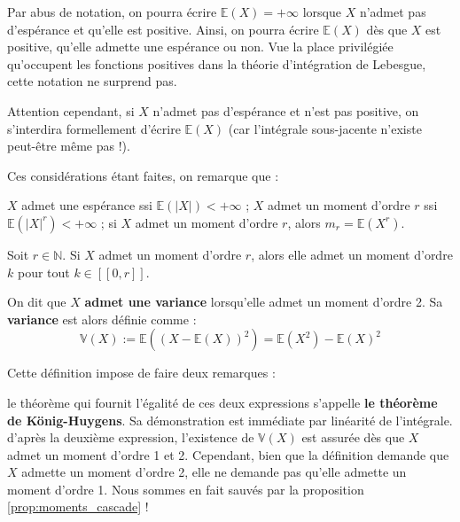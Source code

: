 \documentclass[../integ-proba.tex]{subfiles}
\begin{document}
\begin{rem}
    Par abus de notation, on pourra écrire $\mathbb{E}(X)=+\infty$ lorsque $X$ n'admet pas d'espérance et qu'elle est positive.
    Ainsi, on pourra écrire $\mathbb{E}(X)$ dès que $X$ est positive, qu'elle admette une espérance ou non.
    Vue la place privilégiée qu'occupent les fonctions positives dans la théorie d'intégration de Lebesgue, cette notation ne surprend pas.
    
    Attention cependant, si $X$ n'admet pas d'espérance et n'est pas positive, on s'interdira formellement d'écrire $\mathbb{E}(X)$ (car l'intégrale sous-jacente n'existe peut-être même pas !).
\end{rem}

\begin{rem}
    Ces considérations étant faites, on remarque que :
    \begin{itemize}
        \itemb $X$ admet une espérance ssi $\mathbb{E}(\left| X \right|) < +\infty$ ;
        \itemb $X$ admet un moment d'ordre $r$ ssi $\mathbb{E}(\left| X \right|^r) < +\infty$ ;
        \itemb si $X$ admet un moment d'ordre $r$, alors $m_r = \mathbb{E}(X^r)$.
    \end{itemize}
\end{rem}

\begin{prop}
    \label{prop:moments_cascade}
    Soit $r\in\mathbb{N}$. Si $X$ admet un moment d'ordre $r$, alors elle admet un moment d'ordre $k$ pour tout $k\in[\![0,r]\!]$.
\end{prop}

\begin{defi}
    On dit que $X$ \textbf{admet une variance} lorsqu'elle admet un moment d'ordre 2.
    Sa \textbf{variance} est alors définie comme :
    $$
    \mathbb{V}(X):=\mathbb{E}\left(\left(X - \mathbb{E}\left(X\right)\right)^2\right)=\mathbb{E}\left(X^2\right) - \mathbb{E}\left(X\right)^2
    $$
\end{defi}

\begin{rem}
    Cette définition impose de faire deux remarques :
    \begin{itemize}
        \itemb le théorème qui fournit l'égalité de ces deux expressions s'appelle \textbf{le théorème de König-Huygens}. Sa démonstration est immédiate par linéarité de l'intégrale.
        \itemb d'après la deuxième expression, l'existence de $\mathbb{V}(X)$ est assurée dès que $X$ admet un moment d'ordre 1 et 2.
        Cependant, bien que la définition demande que $X$ admette un moment d'ordre 2, elle ne demande pas qu'elle admette un moment d'ordre 1.
        Nous sommes en fait sauvés par la proposition \ref{prop:moments_cascade} !
    \end{itemize}
\end{rem}
\end{document}

